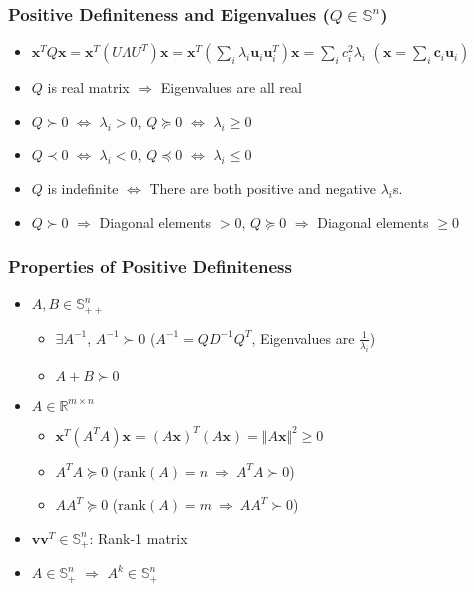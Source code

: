 \subsubsection*{Positive Definiteness and Eigenvalues ($Q \in \mathbb{S}^n$)}
\begin{itemize}
    \item $\mathbf{x}^T Q\mathbf{x} = \mathbf{x}^T (U\Lambda U^T) \mathbf{x}
        = \mathbf{x}^T \left(\sum_i \lambda_i \mathbf{u}_i \mathbf{u}_i^T\right) \mathbf{x}
        = \sum_i c_i^2 \lambda_i$ $\left(\mathbf{x} = \sum_i \mathbf{c}_i \mathbf{u}_i\right)$
    \item $Q$ is real matrix $\Rightarrow$ Eigenvalues are all real
    \item $Q \succ 0$ $\Leftrightarrow$ $\lambda_i > 0$, $Q \succeq 0$ $\Leftrightarrow$ $\lambda_i \geq 0$
    \item $Q \prec 0$ $\Leftrightarrow$ $\lambda_i < 0$, $Q \preceq 0$ $\Leftrightarrow$ $\lambda_i \leq 0$
    \item $Q$ is indefinite $\Leftrightarrow$ There are both positive and negative $\lambda_i$s.
    \item $Q \succ 0$ $\Rightarrow$ Diagonal elements $> 0$, $Q \succeq 0$ $\Rightarrow$ Diagonal elements $\geq 0$
\end{itemize}

\subsubsection*{Properties of Positive Definiteness}
\begin{itemize}
    \item $A, B \in \mathbb{S}_{++}^n$
    \begin{itemize}
        \item $\exists A^{-1}$, $A^{-1} \succ 0$ ($A^{-1} = QD^{-1}Q^T$, Eigenvalues are $\frac 1 {\lambda_i}$)
        \item $A + B \succ 0$
    \end{itemize}
    \item $A \in \mathbb{R}^{m \times n}$
    \begin{itemize}
        \item $\mathbf{x}^T\left(A^TA\right)\mathbf{x} = (A\mathbf{x})^T(A\mathbf{x}) = \Vert A\mathbf{x} \Vert^2 \geq 0$
        \item $A^TA \succeq 0$ ($\mathrm{rank}(A) = n~\Rightarrow~A^TA \succ 0$)
        \item $AA^T \succeq 0$ ($\mathrm{rank}(A) = m~\Rightarrow~AA^T \succ 0$)
    \end{itemize}
    \item $\mathbf{v}\mathbf{v}^T \in \mathbb{S}_+^n$: Rank-1 matrix
    \item $A \in \mathbb{S}_+^n$ $\Rightarrow$ $A^k \in \mathbb{S}_+^n$
\end{itemize}

